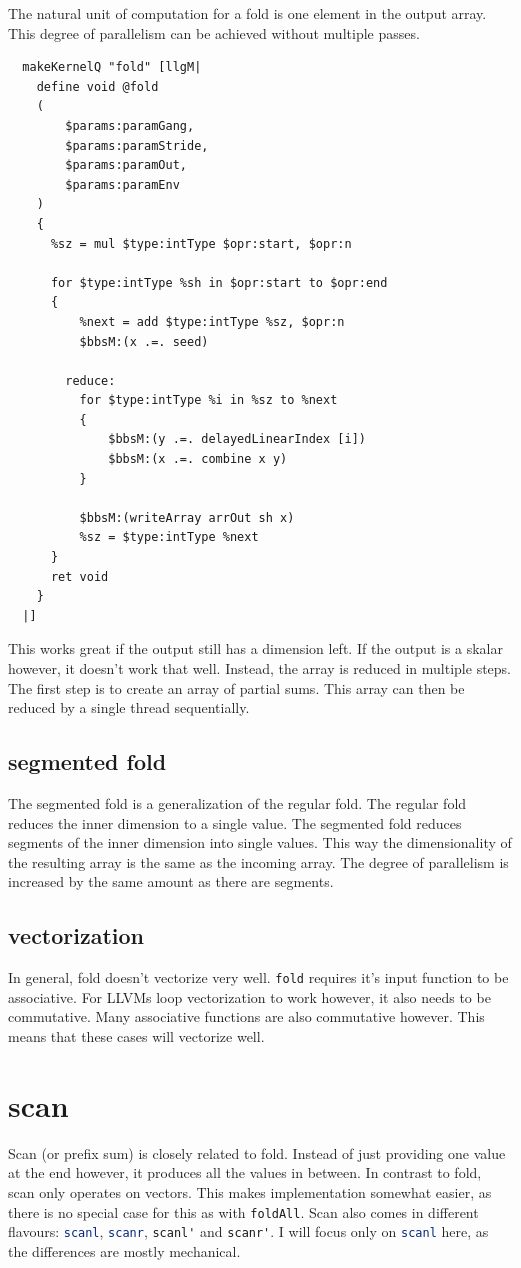 \documentclass[a4paper,bibliography=totocnumbered,parskip,headsepline]{scrbook}
\begin{document}
The natural unit of computation for a fold is one element in the output array.
This degree of parallelism can be achieved without multiple passes.
\begin{lstlisting}
  makeKernelQ "fold" [llgM|
    define void @fold
    (
        $params:paramGang,
        $params:paramStride,
        $params:paramOut,
        $params:paramEnv
    )
    {
      %sz = mul $type:intType $opr:start, $opr:n

      for $type:intType %sh in $opr:start to $opr:end
      {
          %next = add $type:intType %sz, $opr:n
          $bbsM:(x .=. seed)

        reduce:
          for $type:intType %i in %sz to %next
          {
              $bbsM:(y .=. delayedLinearIndex [i])
              $bbsM:(x .=. combine x y)
          }

          $bbsM:(writeArray arrOut sh x)
          %sz = $type:intType %next
      }
      ret void
    }
  |]
\end{lstlisting}
This works great if the output still has a dimension left.
If the output is a skalar however, it doesn't work that well.
Instead, the array is reduced in multiple steps.
The first step is to create an array of partial sums.
This array can then be reduced by a single thread sequentially.

\subsection{segmented fold}
The segmented fold is a generalization of the regular fold.
The regular fold reduces the inner dimension to a single value.
The segmented fold reduces segments of the inner dimension into single values.
This way the dimensionality of the resulting array is the same as the incoming array.
The degree of parallelism is increased by the same amount as there are segments.

\subsection{vectorization}
In general, fold doesn't vectorize very well.
\lstinline[language=haskell]!fold! requires it's input function to be associative.
For LLVMs loop vectorization to work however, it also needs to be commutative.
Many associative functions are also commutative however.
This means that these cases will vectorize well.

\section{scan}
Scan (or prefix sum) is closely related to fold.
Instead of just providing one value at the end however, it produces all the values in between.
In contrast to fold, scan only operates on vectors.
This makes implementation somewhat easier, as there is no special case for this as with \lstinline[language=haskell]!foldAll!.
Scan also comes in different flavours: \lstinline[language=haskell]!scanl!, \lstinline[language=haskell]!scanr!, \lstinline[language=haskell]!scanl'! and \lstinline[language=haskell]!scanr'!.
I will focus only on \lstinline[language=haskell]!scanl! here, as the differences are mostly mechanical.
\end{document}
